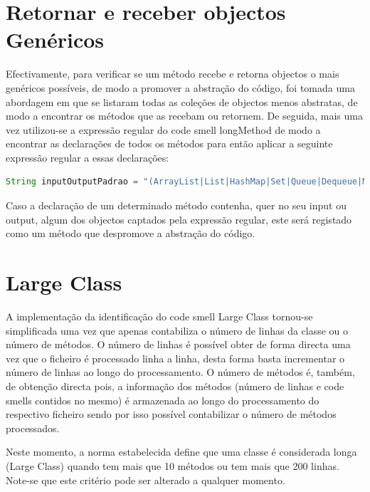 \section{Retornar e receber objectos Genéricos}

\par Efectivamente, para verificar se um método recebe e retorna objectos o mais genéricos possíveis, de modo a promover a abstração do código, foi tomada uma abordagem em que se listaram todas as coleções de objectos menos abstratas, de modo a encontrar os métodos que as recebam ou retornem. De seguida, mais uma vez utilizou-se a expressão regular do code smell longMethod de modo a encontrar as declarações de todos os métodos para então aplicar a seguinte expressão regular a essas declarações:

\begin{lstlisting}[language=Java]  
String inputOutputPadrao = "(ArrayList|List|HashMap|Set|Queue|Dequeue|Map|ListIterator|SortedSet|SortedMap|HashSet|TreeSet|LinkedList|TreeMap|PriorityQueue)";
\end{lstlisting}

\par Caso a declaração de um determinado método contenha, quer no seu input ou output, algum dos objectos captados pela expressão regular, este será registado como um método que despromove a abstração do código.


\section{Large Class}

\par A implementação da identificação do code smell Large Class tornou-se simplificada uma vez que apenas contabiliza o número de linhas da classe ou o número de métodos. O número de linhas é possível obter de forma directa uma vez que o ficheiro é processado linha a linha, desta forma basta incrementar o número de linhas ao longo do processamento. O número de métodos é, também, de obtenção directa pois, a informação dos métodos (número de linhas e code smells contidos no mesmo) é armazenada ao longo do processamento do respectivo ficheiro sendo por isso possível contabilizar o número de métodos processados. 

\par Neste momento, a norma estabelecida define que uma classe é considerada longa (Large Class) quando tem mais que 10 métodos ou tem mais que 200 linhas. Note-se que este critério pode ser alterado a qualquer momento.

